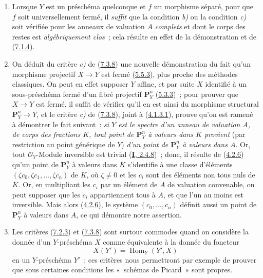 \begin{remark}[7.3.9]
\label{II.7.3.9-fr}
\begin{enumerate}
\item[\rm (i)] Lorsque $Y$ est un préschéma quelconque et $f$ un morphisme
séparé, pour que $f$ soit universellement fermé, il \emph{suffit} que la
condition \emph{b)} ou la condition \emph{c)} soit vérifiée pour les anneaux de valuation
$A$ \emph{complets} et dont le corps des restes est \emph{algébriquement
clos}~; cela résulte en effet de la démonstration et de
(\hyperref[II.7.1.4-fr]{7.1.4}).
\item[\rm (ii)] On déduit du critère \emph{c)} de
(\hyperref[II.7.3.8-fr]{7.3.8}) une nouvelle démonstration du fait qu'un
morphisme projectif $X\to Y$ est fermé (\hyperref[II.5.5.3-fr]{5.5.3}), plus
proche des méthodes classiques. On peut en effet supposer $Y$ affine, et par
suite $X$ identifié à un sous-préschéma fermé d'un fibré projectif
$\mathbf{P}_Y^n$ (\hyperref[II.5.3.3-fr]{5.3.3})~; pour prouver que $X\to Y$
est fermé, il suffit de vérifier qu'il en est ainsi du morphisme structural
$\mathbf{P}_Y^n\to Y$, et le critère \emph{c)} de
(\hyperref[II.7.3.8-fr]{7.3.8}), joint à
(\hyperref[II.4.1.3.1-fr]{4.1.3.1}), prouve qu'on est ramené à démontrer le
fait suivant~: \emph{si $Y$ est le spectre d'un anneau de valuation $A$, de
corps des fractions $K$, tout point de $\mathbf{P}_Y^n$ à valeurs dans $K$
provient} (par restriction au point générique de $Y$) \emph{d'un point de
$\mathbf{P}_Y^n$ à valeurs dans $A$}. Or, tout $\mathcal{O}_Y$-Module
inversible est trivial (\hyperref[I.2.4.8-fr]{\textbf{I}, 2.4.8})~; donc, il résulte de
(\hyperref[II.4.2.6-fr]{4.2.6}) qu'un point de $\mathbf{P}_Y^n$ à valeurs dans
$K$ s'identifie à une classe d'éléments $(\zeta c_0,\zeta c_1,\ldots,\zeta
c_n)$ de $K$, où $\zeta\neq0$ et les $c_i$ sont des éléments non tous nuls de
$K$. Or, en multipliant les $c_i$ par un élément de $A$ de
valuation convenable, on peut supposer que les $c_i$ appartiennent tous à
$A$, et que l'un au moins est inversible. Mais alors
(\hyperref[II.4.2.6-fr]{4.2.6}), le système $(c_0,\ldots,c_n)$ définit aussi
un point de $\mathbf{P}_Y^n$ à valeurs dans $A$, ce qui démontre notre
assertion.
\item[\rm (iii)] Les critères (\hyperref[II.7.2.3-fr]{7.2.3}) et
(\hyperref[II.7.3.8-fr]{7.3.8}) sont surtout commodes quand on considère la
donnée d'un $Y$-préschéma $X$ comme équivalente à la donnée du foncteur
\[
X(Y')=\operatorname{Hom}_Y(Y',X)
\]
en un $Y$-préschéma $Y'$~; ces critères nous permettront par exemple de
prouver que sous certaines conditions les «~schémas de Picard~» sont propres.
\end{enumerate}
\end{remark}

